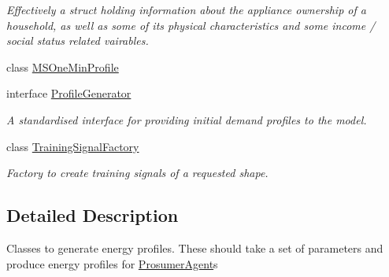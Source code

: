 \begin{DoxyCompactItemize}
\begin{DoxyCompactList}\small\item\em Effectively a struct holding information about the appliance ownership of a household, as well as some of its physical characteristics and some income / social status related vairables. \end{DoxyCompactList}\item 
class \hyperlink{classuk_1_1ac_1_1dmu_1_1iesd_1_1cascade_1_1util_1_1profilegenerators_1_1_m_s_one_min_profile}{M\-S\-One\-Min\-Profile}
\item 
interface \hyperlink{interfaceuk_1_1ac_1_1dmu_1_1iesd_1_1cascade_1_1util_1_1profilegenerators_1_1_profile_generator}{Profile\-Generator}
\begin{DoxyCompactList}\small\item\em A standardised interface for providing initial demand profiles to the model. \end{DoxyCompactList}\item 
class \hyperlink{classuk_1_1ac_1_1dmu_1_1iesd_1_1cascade_1_1util_1_1profilegenerators_1_1_training_signal_factory}{Training\-Signal\-Factory}
\begin{DoxyCompactList}\small\item\em Factory to create training signals of a requested shape. \end{DoxyCompactList}\end{DoxyCompactItemize}


\subsection{Detailed Description}
Classes to generate energy profiles. These should take a set of parameters and produce energy profiles for \hyperlink{}{Prosumer\-Agent}s 